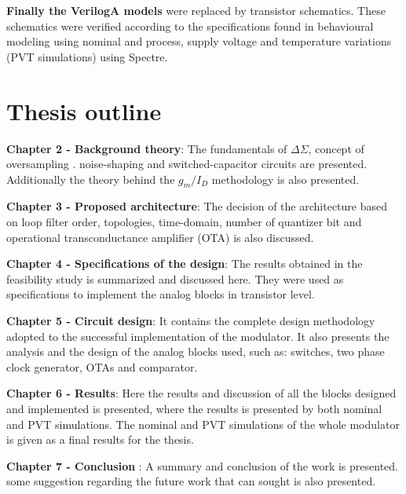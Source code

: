 \textbf{Finally the VerilogA models} were replaced by transistor schematics. These schematics were verified according to the specifications found in behavioural modeling using nominal and process, supply voltage and temperature variations (PVT simulations) using Spectre. 

\section{Thesis outline}

\textbf{Chapter 2 - Background theory}: The fundamentals of $\Delta\Sigma$, concept of oversampling . noise-shaping and switched-capacitor circuits are presented. Additionally the theory behind the $g_m/I_D$ methodology is also presented. 

\textbf{Chapter 3 - Proposed architecture}: The decision of the architecture based on loop filter order, topologies, time-domain, number of quantizer bit and operational transconductance amplifier (OTA) is also discussed. 

\textbf{Chapter 4 - Specifications of the design}:
The results obtained in the feasibility study is summarized and discussed here. They were used as specifications to implement the analog blocks in transistor level. 

\textbf{Chapter 5 - Circuit design}: It contains the complete design methodology adopted to the successful implementation of the modulator. It also presents the analysis and the design of the analog blocks used, such as: switches, two phase clock generator, OTAs and comparator.    

\textbf{Chapter 6 - Results}: Here the results and discussion of all the blocks designed and implemented is presented, where the results is presented by both nominal and PVT simulations. The nominal and PVT simulations of the whole modulator is given as a final results for the thesis. 

\textbf{Chapter 7 - Conclusion} : A summary and conclusion of the work is presented. some suggestion regarding the future work that can sought is also presented. 